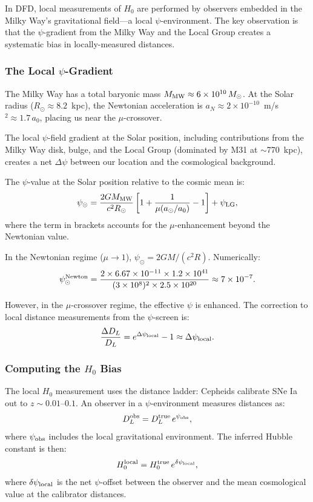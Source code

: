 \documentclass[aps,prd,twocolumn,superscriptaddress,nofootinbib]{revtex4-2}
\begin{document}
In DFD, local measurements of $H_0$ are performed by observers
embedded in the Milky Way's gravitational field---a local
$\psi$-environment. The key observation is that the
$\psi$-gradient from the Milky Way and the Local Group creates
a systematic bias in locally-measured distances.

\subsubsection{The Local $\psi$-Gradient}

The Milky Way has a total baryonic mass
$M_{\rm MW} \approx 6\times 10^{10}\,M_\odot$. At the Solar
radius ($R_\odot \approx 8.2$~kpc), the Newtonian acceleration
is $a_N \approx 2\times 10^{-10}$~m/s$^2 \approx 1.7\,a_0$,
placing us near the $\mu$-crossover.

The local $\psi$-field gradient at the Solar position, including
contributions from the Milky Way disk, bulge, and the Local Group
(dominated by M31 at $\sim$770~kpc), creates a net $\Delta\psi$
between our location and the cosmological background.

The $\psi$-value at the Solar position relative to the cosmic
mean is:
\begin{equation}
\psi_\odot = \frac{2GM_{\rm MW}}{c^2 R_\odot}\left[
1 + \frac{1}{\mu(a_\odot/a_0)} - 1\right] + \psi_{\rm LG},
\end{equation}
where the term in brackets accounts for the $\mu$-enhancement
beyond the Newtonian value.

In the Newtonian regime ($\mu \to 1$), $\psi_\odot = 2GM/(c^2 R)$.
Numerically:
\begin{equation}
\psi_\odot^{\rm Newton} = \frac{2 \times 6.67\times10^{-11}
\times 1.2\times10^{41}}{(3\times10^8)^2 \times 2.5\times10^{20}}
\approx 7\times 10^{-7}.
\end{equation}

However, in the $\mu$-crossover regime, the effective $\psi$ is
enhanced. The correction to local distance measurements from the
$\psi$-screen is:
\begin{equation}
\frac{\Delta D_L}{D_L} = e^{\Delta\psi_{\rm local}} - 1
\approx \Delta\psi_{\rm local}.
\end{equation}

\subsubsection{Computing the $H_0$ Bias}

The local $H_0$ measurement uses the distance ladder:
Cepheids calibrate SNe Ia out to $z \sim 0.01$--$0.1$.
An observer in a $\psi$-environment measures distances
as:
\begin{equation}
D_L^{\rm obs} = D_L^{\rm true}\,e^{\psi_{\rm obs}},
\end{equation}
where $\psi_{\rm obs}$ includes the local gravitational
environment. The inferred Hubble constant is then:
\begin{equation}
H_0^{\rm local} = H_0^{\rm true}\,e^{\delta\psi_{\rm local}},
\end{equation}
where $\delta\psi_{\rm local}$ is the net $\psi$-offset between
the observer and the mean cosmological value at the calibrator
distances.
\end{document}
